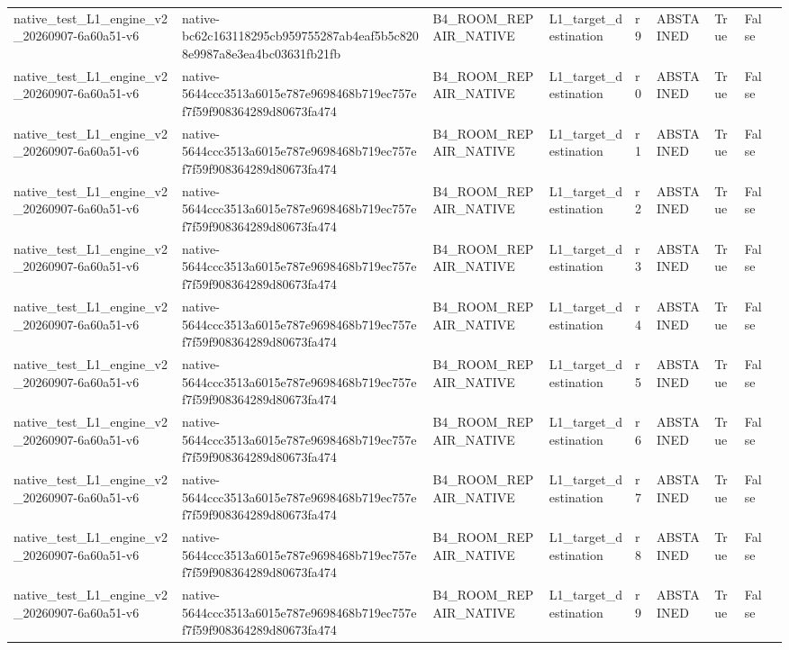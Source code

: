\begin{tabular}{lllllllll}
native\_test\_L1\_engine\_v2\_20260907-6a60a51-v6 & native-bc62c163118295cb959755287ab4eaf5b5c8208e9987a8e3ea4bc03631fb21fb & B4\_ROOM\_REPAIR\_NATIVE & L1\_target\_destination & r9 & ABSTAINED & True & False &  \\
native\_test\_L1\_engine\_v2\_20260907-6a60a51-v6 & native-5644ccc3513a6015e787e9698468b719ec757ef7f59f908364289d80673fa474 & B4\_ROOM\_REPAIR\_NATIVE & L1\_target\_destination & r0 & ABSTAINED & True & False &  \\
native\_test\_L1\_engine\_v2\_20260907-6a60a51-v6 & native-5644ccc3513a6015e787e9698468b719ec757ef7f59f908364289d80673fa474 & B4\_ROOM\_REPAIR\_NATIVE & L1\_target\_destination & r1 & ABSTAINED & True & False &  \\
native\_test\_L1\_engine\_v2\_20260907-6a60a51-v6 & native-5644ccc3513a6015e787e9698468b719ec757ef7f59f908364289d80673fa474 & B4\_ROOM\_REPAIR\_NATIVE & L1\_target\_destination & r2 & ABSTAINED & True & False &  \\
native\_test\_L1\_engine\_v2\_20260907-6a60a51-v6 & native-5644ccc3513a6015e787e9698468b719ec757ef7f59f908364289d80673fa474 & B4\_ROOM\_REPAIR\_NATIVE & L1\_target\_destination & r3 & ABSTAINED & True & False &  \\
native\_test\_L1\_engine\_v2\_20260907-6a60a51-v6 & native-5644ccc3513a6015e787e9698468b719ec757ef7f59f908364289d80673fa474 & B4\_ROOM\_REPAIR\_NATIVE & L1\_target\_destination & r4 & ABSTAINED & True & False &  \\
native\_test\_L1\_engine\_v2\_20260907-6a60a51-v6 & native-5644ccc3513a6015e787e9698468b719ec757ef7f59f908364289d80673fa474 & B4\_ROOM\_REPAIR\_NATIVE & L1\_target\_destination & r5 & ABSTAINED & True & False &  \\
native\_test\_L1\_engine\_v2\_20260907-6a60a51-v6 & native-5644ccc3513a6015e787e9698468b719ec757ef7f59f908364289d80673fa474 & B4\_ROOM\_REPAIR\_NATIVE & L1\_target\_destination & r6 & ABSTAINED & True & False &  \\
native\_test\_L1\_engine\_v2\_20260907-6a60a51-v6 & native-5644ccc3513a6015e787e9698468b719ec757ef7f59f908364289d80673fa474 & B4\_ROOM\_REPAIR\_NATIVE & L1\_target\_destination & r7 & ABSTAINED & True & False &  \\
native\_test\_L1\_engine\_v2\_20260907-6a60a51-v6 & native-5644ccc3513a6015e787e9698468b719ec757ef7f59f908364289d80673fa474 & B4\_ROOM\_REPAIR\_NATIVE & L1\_target\_destination & r8 & ABSTAINED & True & False &  \\
native\_test\_L1\_engine\_v2\_20260907-6a60a51-v6 & native-5644ccc3513a6015e787e9698468b719ec757ef7f59f908364289d80673fa474 & B4\_ROOM\_REPAIR\_NATIVE & L1\_target\_destination & r9 & ABSTAINED & True & False &  \\

\end{tabular}
